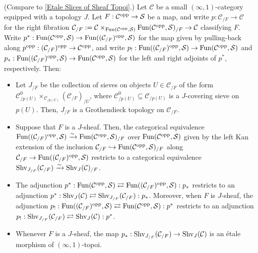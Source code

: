 \documentclass[10pt]{article}
\newcommand{\mS}{\mathcal S}
\newcommand{\C}{\mathcal C}
\theoremstyle{witharg}
\theoremstyle{witharg}
\theoremstyle{witharg2}
\begin{document}
\begin{proposition}{}\label{Etale Slices of Sheaf Topoi Intro}

    (Compare to \ref{Etale Slices of Sheaf Topoi}.) Let $\C$ be a small $(\infty,1)$-category equipped with a topology $J$. Let $F:\C^{\textnormal{opp}}\rightarrow \mS$ be a map, and write $p:\C_{/F}\rightarrow \C$ for the right fibration $\C_{/F}:=\C\times_{\textnormal{Fun}(\C^{\textnormal{opp}},\mS)}\textnormal{Fun}(\C^{\textnormal{opp}},\mS)_{/F}\rightarrow \C$ classifying $F$. Write $p^*:\textnormal{Fun}(\C^{\textnormal{opp}},\mS)\rightarrow \textnormal{Fun}((\C_{/F})^{\textnormal{opp}},\mS)$ for the map given by pulling-back along $p^{\textnormal{opp}}:(\C_{/F})^{\textnormal{opp}}\rightarrow \C^{\textnormal{opp}}$, and write $p_!:\textnormal{Fun}((\C_{/F})^{\textnormal{opp}},\mS)\rightarrow \textnormal{Fun}(\C^{\textnormal{opp}},\mS)$ and $p_*:\textnormal{Fun}((\C_{/F})^{\textnormal{opp}},\mS)\rightarrow \textnormal{Fun}(\C^{\textnormal{opp}},\mS)$ for the left and right adjoints of $p^*$, respectively. Then:

    \begin{itemize}

        \item [$(1)$] Let $J_{/F}$ be the collection of sieves on objects $U\in \C_{/F}$ of the form $\C^{0}_{/p(U)}\times_{\C_{/p(U)}}(\C_{/F})_{/U}$, where $\C^{0}_{/p(U)}\subseteq \C_{/p(U)}$ is a $J$-covering sieve on $p(U)$. Then, $J_{/F}$ is a Grothendieck topology on $\C_{/F}$.


        \item [$(2)$] Suppose that $F$ is a $J$-sheaf. Then, the categorical equivalence $\textnormal{Fun}((\C_{/F})^{\textnormal{opp}},\mS)\xrightarrow{\sim}\textnormal{Fun}(\C^{\textnormal{opp}},\mS)_{/F}$ over $\textnormal{Fun}(\C^{\textnormal{opp}},\mS)$ given by the left Kan extension of the inclusion $\C_{/F}\hookrightarrow \textnormal{Fun}(\C^{\textnormal{opp}},\mS)_{/F}$ along $\C_{/F}\rightarrow \textnormal{Fun}((\C_{/F})^{\textnormal{opp}},\mS)$ restricts to a categorical equivalence $\textnormal{Shv}_{J_{/F}}(\C_{/F})\xrightarrow{\sim}\textnormal{Shv}_{J}(\C)_{/F}$.

        \item [$(3)$] The adjunction $p^*:\textnormal{Fun}(\C^{\textnormal{opp}},\mS)\rightleftarrows \textnormal{Fun}((\C_{/F})^{\textnormal{opp}},\mS):p_*$ restricts to an adjunction $p^*:\textnormal{Shv}_{J}(\C)\rightleftarrows \textnormal{Shv}_{J_{/F}}(\C_{/F}):p_*$. Moreover, when $F$ is $J$-sheaf, the adjunction $p_!:\textnormal{Fun}((\C_{/F})^{\textnormal{opp}},\mS)\rightleftarrows\textnormal{Fun}(\C^{\textnormal{opp}},\mS):p^*$ restricts to an adjunction $p_!:\textnormal{Shv}_{J_{/F}}(\C_{/F})\rightleftarrows \textnormal{Shv}_{J}(\C):p^*$. 

        \item [$(4)$] Whenever $F$ is a $J$-sheaf, the map $p_*:\textnormal{Shv}_{J_{/F}}(\C_{/F})\rightarrow \textnormal{Shv}_{J}(\C)$ is an \'{e}tale morphism of $(\infty,1)$-topoi. 
     

    \end{itemize}

\end{proposition}
\end{document}
